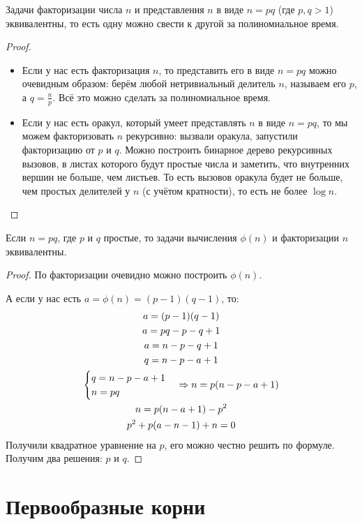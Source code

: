 \begin{theorem}
	Задачи факторизации числа $n$ и представления $n$ в виде $n=pq$ (где $p,q > 1$) эквивалентны,
	то есть одну можно свести к другой за полиномиальное время.
\end{theorem}
\begin{proof}
\begin{itemize}
\item
	Если у нас есть факторизация $n$, то представить его в виде $n=pq$ можно очевидным образом: берём любой нетривиальный делитель $n$, называем его $p$, а $q=\frac np$.
	Всё это можно сделать за полиномиальное время.
\item
	Если у нас есть оракул, который умеет представлять $n$ в виде $n=pq$, то мы можем факторизовать $n$ рекурсивно: вызвали оракула, запустили факторизацию от $p$ и $q$.
	Можно построить бинарное дерево рекурсивных вызовов, в листах которого будут простые числа и заметить, что внутренних вершин не больше, чем листьев.
	То есть вызовов оракула будет не больше, чем простых делителей у $n$ (с учётом кратности), то есть не более $\log n$.
\end{itemize}
\end{proof}

\begin{theorem}
	Если $n=pq$, где $p$ и $q$ простые, то задачи вычисления $\phi(n)$ и факторизации $n$ эквивалентны.
\end{theorem}
\begin{proof}
	По факторизации очевидно можно построить $\phi(n)$.

	А если у нас есть $a=\phi(n)=(p-1)(q-1)$, то:
	\begin{gather*}
	a=(p-1)(q-1) \\
	a=pq-p-q+1 \\
	a=n-p-q+1 \\
	q=n-p-a+1 \\
	\begin{cases}
	q=n-p-a+1 \\
	n=pq
	\end{cases}
	\Rightarrow
	n = p(n-p-a+1) \\
	n = p(n-a+1)-p^2 \\
	p^2 + p(a-n-1) + n = 0 \\
	\end{gather*}
	Получили квадратное уравнение на $p$, его можно честно решить по формуле.
	Получим два решения: $p$ и $q$.
\end{proof}

\section{Первообразные корни}

